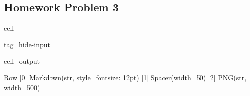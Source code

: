 \documentclass[letterpaper,10pt,english]{jupyterBook}
\begin{document}
\subsection{Homework Problem 3}
\label{\detokenize{content/tutorials/T6/tutorial_06:homework-problem-3}}
\begin{sphinxuseclass}{cell}
\begin{sphinxuseclass}{tag_hide-input}\begin{sphinxVerbatimOutput}

\begin{sphinxuseclass}{cell_output}
\begin{sphinxVerbatim}[commandchars=\\\{\}]
Row
    [0] Markdown(str, style=\PYGZob{}\PYGZsq{}font\PYGZhy{}size\PYGZsq{}: \PYGZsq{}12pt\PYGZsq{}\PYGZcb{})
    [1] Spacer(width=50)
    [2] PNG(str, width=500)
\end{sphinxVerbatim}

\end{sphinxuseclass}\end{sphinxVerbatimOutput}

\end{sphinxuseclass}
\end{sphinxuseclass}
\end{document}
